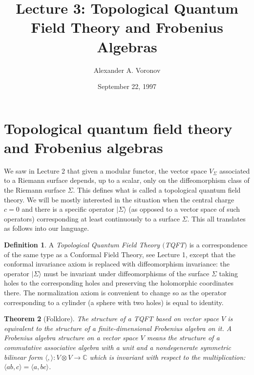 \documentclass{amsart}
\newcommand{\nc}{\mathbb{C}}
\newtheorem{thm}{Theorem}[section]
\theoremstyle{definition}
\newtheorem{df}[thm]{Definition}
\theoremstyle{remark}
\numberwithin{equation}{section}
\begin{document}
\title[Lecture 3]{Lecture 3: Topological Quantum Field Theory and Frobenius Algebras}
\author{Alexander A. Voronov}

\date{September 22, 1997}

\maketitle

\section{Topological quantum field theory and Frobenius algebras}

We saw in Lecture 2 that given a modular functor, the vector space
$V_\Sigma$ associated to a Riemann surface depends, up to a scalar,
only on the diffeomorphism class of the Riemann surface $\Sigma$. This
defines what is called a topological quantum field theory. We will be
mostly interested in the situation when the central charge $c = 0$ and
there is a specific operator $|\Sigma\rangle$ (as opposed to a vector
space of such operators) corresponding at least continuously to a
surface $\Sigma$. This all translates as follows into our language.

\begin{df}
A \emph{Topological Quantum Field Theory $($TQFT$)$} is a
correspondence of the same type as a Conformal Field Theory, see
Lecture 1, except that the conformal invariance axiom is replaced with
diffeomorphism invariance: the operator $|\Sigma\rangle$ must be
invariant under diffeomorphisms of the surface $\Sigma$ taking holes
to the corresponding holes and preserving the holomorphic coordinates
there. The normalization axiom is convenient to change so as the
operator corresponding to a cylinder (a sphere with two holes) is
equal to identity.
\end{df}

\begin{thm}[Folklore]
The structure of a TQFT based on vector space $V$ is equivalent to the
structure of a finite-dimensional Frobenius algebra on it. A
\emph{Frobenius algebra} structure on a vector space $V$ means the
structure of a commutative associative algebra with a unit and a
nondegenerate symmetric bilinear form $\langle,\rangle: V \otimes V
\to \nc$ which is invariant with respect to the multiplication: $\langle
ab, c\rangle = \langle a, bc \rangle$.
\end{thm}
\end{document}
